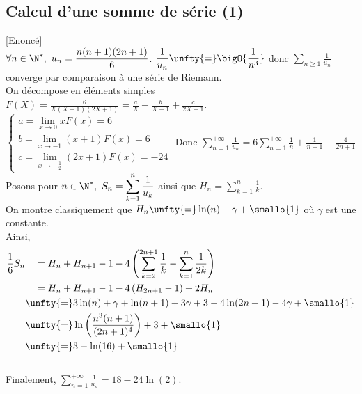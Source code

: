 \documentclass{book}
\begin{document}
	\subsection{Calcul d'une somme de série (1) }
	\label{Calcul d'une somme de série (1) corrigé}
	\textcolor{blue}{\hyperref[Calcul d'une somme de série (1)]{[Enoncé]}}\\
	$\forall n\in \N^*,\ u_n=\displaystyle\frac{n(n+1)(2n+1)}{6}$. $\displaystyle\frac{1}{u_n}\unfty{=}\bigO{\frac{1}{n^3}}$ donc $\displaystyle\sum\limits_{n\geq 1}\frac{1}{u_n}$ converge par comparaison à une série de Riemann.\\
	On décompose en éléments simples $F(X)=\displaystyle\frac{6}{X(X+1)(2X+1)}=\displaystyle\frac{a}{X}+\displaystyle\frac{b}{X+1}+\displaystyle\frac{c}{2X+1}$.\\
	$\begin{cases}
		a=\lim\limits_{x\to 0}xF(x)=6\\
		b=\lim\limits_{x\to -1}(x+1)F(x)=6\\
		c=\lim\limits_{x\to -\frac{1}{2}}(2x+1)F(x)=-24
	\end{cases}$
	Donc $\displaystyle\sum\limits_{n=1}^{+\infty}\frac{1}{u_n}=6\sum\limits_{n=1}^{+\infty}\frac{1}{n}+\frac{1}{n+1}-\frac{4}{2n+1}$\\
	Posons pour $n\in \N^*,\ S_n=\displaystyle\sum\limits_{k=1}^{n}\frac{1}{u_k}$ ainsi que $H_n=\displaystyle\sum\limits_{k=1}^{n}\frac{1}{k}$.\\
	On montre classiquement que $H_n\unfty{=}\ln(n)+\gamma+\smallo{1}$ où $\gamma$ est une constante.\\
	Ainsi,
	\begin{align*}
		\displaystyle\frac{1}{6}S_n&\ \ \ =H_n+H_{n+1}-1-4\left(\displaystyle\sum\limits_{k=2}^{2n+1}\frac{1}{k}-\sum\limits_{k=1}^n\frac{1}{2k}\right)\\
		&\ \ \ =H_n+H_{n+1}-1-4\left(H_{2n+1}-1\right)+2H_n\\
		&\unfty{=}3\ln(n)+\gamma+\ln(n+1)+3\gamma+3-4\ln(2n+1)-4\gamma+\smallo{1}\\
		&\unfty{=}\ln\left(\displaystyle\frac{n^3(n+1)}{(2n+1)^4}\right)+3+\smallo{1}\\
		&\unfty{=}3-\ln(16)+\smallo{1}
	\end{align*}\\
	Finalement, $\displaystyle\sum\limits_{n=1}^{+\infty}\frac{1}{u_n}=18-24\ln(2)$.
	
\end{document}
